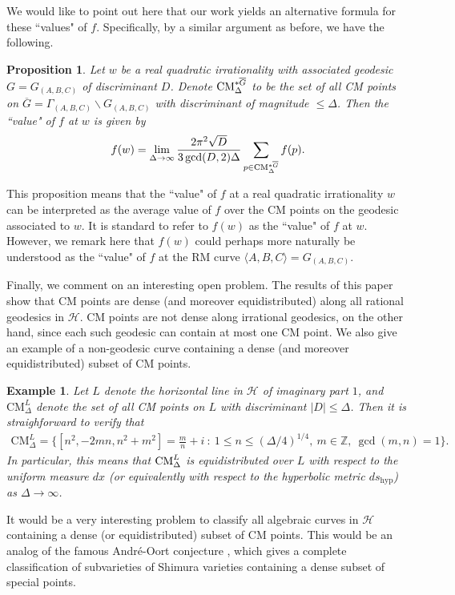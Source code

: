 \documentclass[11pt,letterpaper,reqno]{amsart}
\newtheorem{proposition}[theorem]{Proposition}
\newtheorem{example}[theorem]{Example}
\numberwithin{equation}{section}
\numberwithin{figure}{section}
\numberwithin{table}{section}
\newcommand{\HH}{\mathcal{H}}
\newcommand{\CM}{\textnormal{CM}}
\begin{document}
We would like to point out here that our work yields an alternative formula for these ``values" of $f$. Specifically, by a similar argument as before, we have the following.
\begin{proposition} \label{prop:"value"-of-f-formula}
    Let $w$ be a real quadratic irrationality with associated geodesic $G=G_{(A,B,C)}$ of discriminant $D$. Denote $\CM^{* \overline G}_\Delta$ to be the set of all CM points on $\overline G = \Gamma_{(A,B,C)}\backslash G_{(A,B,C)}$ with discriminant of magnitude $\le \Delta$.
    Then the ``value" of $f$ at $w$ is given by 
    \begin{align}
        f(w) = \lim_{\Delta \to \infty} \frac{2\pi^2 \sqrt D}{3 \gcd(D,2)\Delta} 
        \sum_{
            p \in \CM^{* \overline G}_\Delta
        } f(p).
    \end{align}
\end{proposition}
This proposition means that the ``value" of $f$ at a real quadratic irrationality $w$ can be interpreted as the average value of $f$ over the CM points on the geodesic associated to $w$. It is standard to refer to $f(w)$ as the ``value" of $f$ at $w$. However, we remark here that $f(w)$ could perhaps more naturally be understood as the ``value" of $f$ at the RM curve $\langle A,B,C \rangle = G_{(A,B,C)}$. 







Finally, we comment on an interesting open problem.
The results of this paper show that CM points are dense (and moreover equidistributed) along all rational geodesics in $\HH$. CM points are not dense along irrational geodesics, on the other hand, since each such geodesic can contain at most one CM point. We also give an example of a non-geodesic curve containing a dense (and moreover equidistributed) subset of CM points.
\begin{example}
    Let $L$ denote the horizontal line in $\HH$ of imaginary part $1$, and $\mathrm{CM}^L_\Delta$ denote the set of all CM points on $L$ with discriminant $|D| \le \Delta$. Then it is straighforward to verify that
    \begin{align}
        \mathrm{CM}^L_\Delta = \{ [n^2,-2mn,n^2+m^2]=\tfrac{m}{n}+i ~:~ 1 \le n \le (\Delta/4)^{1/4}, ~ m \in \mathbb{Z}, ~ \gcd(m,n)=1\}.
    \end{align}
    In particular, this means that $\CM^L_\Delta$ is equidistributed over $L$ with respect to the uniform measure $dx$ (or equivalently with respect to the hyperbolic metric $ds_\mathrm{hyp}$) as $\Delta \to \infty$.
\end{example}

It would be a very interesting problem to classify all algebraic curves in $\HH$ containing a dense (or equidistributed) subset of CM points. This would be an analog of the famous Andr\'e-Oort conjecture \cite{andre-oort}, which gives a complete classification of subvarieties of Shimura varieties containing a dense subset of special points. 









\end{document}
